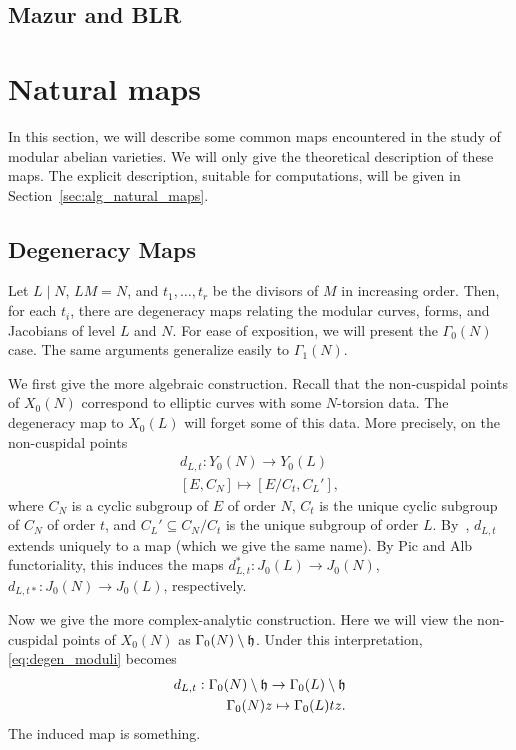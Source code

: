 \documentclass[11pt, proquest]{uwthesis}
\begin{document}
\subsection{Mazur and BLR}%
\label{sub:mazur_and_blr} 


\section{Natural maps}%
\label{sec:natural_maps}

In this section, we will describe some common maps encountered in the study of
modular abelian varieties. We will only give the theoretical description of
these maps. The explicit description, suitable for computations, will be given
in Section~\ref{sec:alg_natural_maps}.

\subsection{Degeneracy Maps}%
\label{sub:degeneracy_maps} 

Let $L\mid N$, $LM=N$, and $t_1,\ldots,t_r$ be the divisors of $M$ in
increasing order. Then, for each $t_i$, there are degeneracy maps relating the
modular curves, forms, and Jacobians of level $L$ and $N$. For ease of
exposition, we will present the $\Gamma_0(N)$ case. The same arguments
generalize easily to $\Gamma_1(N)$.

We first give the more algebraic construction. Recall that the non-cuspidal
points of $X_0(N)$ correspond to elliptic curves with some $N$-torsion data.
The degeneracy map to $X_0(L)$ will forget some of this data. More precisely,
on the non-cuspidal points
\begin{equation}
    \label{eq:degen_moduli}
    \begin{split}
        d_{L,t}: Y_0(N)  \to Y_0(L) \\
        [ E, C_N ]       \mapsto [ E/C_t, C_L ' ],
    \end{split}
\end{equation}
where $C_N$ is a cyclic subgroup of $E$ of order $N$, $C_t$ is the unique
cyclic subgroup of $C_N$ of order $t$, and $C_L '\subseteq C_N/C_t$ is the
unique subgroup of order $L$. By~\cite[Chap. 1, Prop. 6.8]{hartshorne},
$d_{L,t}$ extends uniquely to a map (which we give the same name). By Pic and
Alb functoriality, this induces the maps $d_{L,t} ^*:J_0(L)\to J_0(N)$, $d_{L,
t*} :J_0(N)\to J_0(L)$, respectively. 

Now we give the more complex-analytic construction. Here we will view the
non-cuspidal points of $X_0(N)$ as $\Gamma_0(N)\setminus \mathfrak{h}$. Under this
interpretation, \eqref{eq:degen_moduli} becomes
\begin{equation}
    \label{eq:degen_analytic}
    \begin{split}
        d_{L,t}: \Gamma_0(N)\setminus \mathfrak{h} \to \Gamma_0(L)\setminus \mathfrak{h} \\
        \Gamma_0(N)z\mapsto \Gamma_0(L) tz.
    \end{split}
\end{equation}
The induced map is something.
\end{document}
